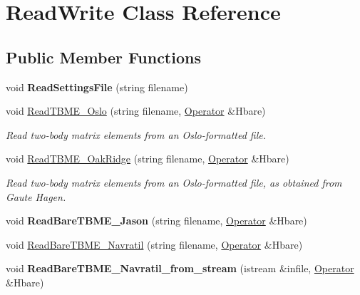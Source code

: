 \hypertarget{classReadWrite}{}\section{Read\+Write Class Reference}
\label{classReadWrite}
\subsection*{Public Member Functions}
\begin{DoxyCompactItemize}
\item 
void {\bfseries Read\+Settings\+File} (string filename)\hypertarget{classReadWrite_a7074f8c5e6b1bbeb90a4c534b913ac53}{}\label{classReadWrite_a7074f8c5e6b1bbeb90a4c534b913ac53}

\item 
void \hyperlink{classReadWrite_aa8d42bb8082881c30331a44f01118381}{Read\+T\+B\+M\+E\+\_\+\+Oslo} (string filename, \hyperlink{classOperator}{Operator} \&Hbare)\hypertarget{classReadWrite_aa8d42bb8082881c30331a44f01118381}{}\label{classReadWrite_aa8d42bb8082881c30331a44f01118381}

\begin{DoxyCompactList}\small\item\em Read two-\/body matrix elements from an Oslo-\/formatted file. \end{DoxyCompactList}\item 
void \hyperlink{classReadWrite_af523031369da2a95d3f462b9b3629748}{Read\+T\+B\+M\+E\+\_\+\+Oak\+Ridge} (string filename, \hyperlink{classOperator}{Operator} \&Hbare)\hypertarget{classReadWrite_af523031369da2a95d3f462b9b3629748}{}\label{classReadWrite_af523031369da2a95d3f462b9b3629748}

\begin{DoxyCompactList}\small\item\em Read two-\/body matrix elements from an Oslo-\/formatted file, as obtained from Gaute Hagen. \end{DoxyCompactList}\item 
void {\bfseries Read\+Bare\+T\+B\+M\+E\+\_\+\+Jason} (string filename, \hyperlink{classOperator}{Operator} \&Hbare)\hypertarget{classReadWrite_ae5271000cceab5fcebab7e9d2faf9f1f}{}\label{classReadWrite_ae5271000cceab5fcebab7e9d2faf9f1f}

\item 
void \hyperlink{classReadWrite_ab66f5d7e2e352e973597915c08cad45d}{Read\+Bare\+T\+B\+M\+E\+\_\+\+Navratil} (string filename, \hyperlink{classOperator}{Operator} \&Hbare)
\item 
void {\bfseries Read\+Bare\+T\+B\+M\+E\+\_\+\+Navratil\+\_\+from\+\_\+stream} (istream \&infile, \hyperlink{classOperator}{Operator} \&Hbare)\hypertarget{classReadWrite_a5945175ede7c2a040f09cfbc799b3066}{}\label{classReadWrite_a5945175ede7c2a040f09cfbc799b3066}


\end{DoxyCompactItemize}
